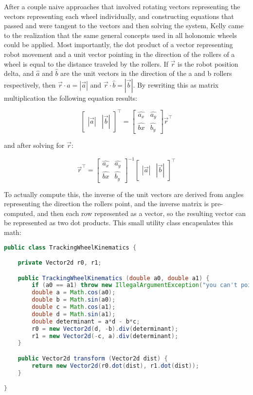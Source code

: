 \documentclass{article}
\begin{document}
After a couple naive approaches that involved rotating vectors representing the vectors representing each wheel individually, and constructing equations that passed and were tangent to the vectors and then solving the system, Kelly came to the realization that the same general concepts used in all holonomic wheels could be applied. Most importantly, the dot product of a vector representing robot movement and a unit vector pointing in the direction of the rollers of a wheel is equal to the distance traveled by the rollers. If $\vec{r}$ is the robot position delta, and $\hat{a}$ and $\hat{b}$ are the unit vectors in the direction of the a and b rollers respectively, then $\vec{r} \cdot \hat{a} = |\vec{a}|$ and $\vec{r} \cdot \hat{b} = |\vec{b}|$. By rewriting this as matrix multiplication the following equation results: 

$$\begin{bmatrix} |\vec{a}| & |\vec{b}| \end{bmatrix}^\top = \begin{bmatrix} \hat{a_x} & \hat{a_y} \\ \hat{b
x} & \hat{b_y} \end{bmatrix} \vec{r}^\top$$

and after solving for $\vec{r}$:

$$\vec{r}^\top = \begin{bmatrix} \hat{a_x} & \hat{a_y} \\ \hat{b
x} & \hat{b_y} \end{bmatrix}^{-1}  \begin{bmatrix} |\vec{a}| & |\vec{b}| \end{bmatrix}^\top $$

To actually compute this, the inverse of the unit vectors are derived from angles representing the direction the rollers point, and the inverse matrix is pre-computed, and then each row represented as a vector, so the resulting vector can be represented as two dot products. This small utility class encapsulates this math:

\begin{lstlisting}[language=Java]
public class TrackingWheelKinematics {

    private Vector2d r0, r1;

    public TrackingWheelKinematics (double a0, double a1) {
        if (a0 == a1) throw new IllegalArgumentException("you can't point them in the same direction silly!!!");
        double a = Math.cos(a0);
        double b = Math.sin(a0);
        double c = Math.cos(a1);
        double d = Math.sin(a1);
        double determinant = a*d - b*c;
        r0 = new Vector2d(d, -b).div(determinant);
        r1 = new Vector2d(-c, a).div(determinant);
    }

    public Vector2d transform (Vector2d dist) {
        return new Vector2d(r0.dot(dist), r1.dot(dist));
    }

}
\end{lstlisting}
\end{document}
